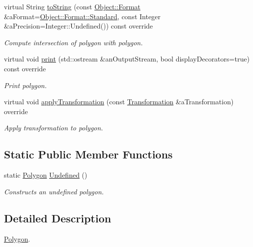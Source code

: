 \begin{DoxyCompactItemize}
virtual String \hyperlink{classlibrary_1_1math_1_1geom_1_1d2_1_1objects_1_1_polygon_acef17857f29323e985fba23441ed1171}{to\+String} (const \hyperlink{classlibrary_1_1math_1_1geom_1_1d2_1_1_object_ac8cd61dada4960cfee9a469231621b17}{Object\+::\+Format} \&a\+Format=\hyperlink{classlibrary_1_1math_1_1geom_1_1d2_1_1_object_ac8cd61dada4960cfee9a469231621b17aeb6d8ae6f20283755b339c0dc273988b}{Object\+::\+Format\+::\+Standard}, const Integer \&a\+Precision=Integer\+::\+Undefined()) const override
\begin{DoxyCompactList}\small\item\em Compute intersection of polygon with polygon. \end{DoxyCompactList}\item 
virtual void \hyperlink{classlibrary_1_1math_1_1geom_1_1d2_1_1objects_1_1_polygon_a028ca7818387654ed1aab1584cee6cc5}{print} (std\+::ostream \&an\+Output\+Stream, bool display\+Decorators=true) const override
\begin{DoxyCompactList}\small\item\em Print polygon. \end{DoxyCompactList}\item 
virtual void \hyperlink{classlibrary_1_1math_1_1geom_1_1d2_1_1objects_1_1_polygon_a920b30eb110c7164f65754979da17638}{apply\+Transformation} (const \hyperlink{classlibrary_1_1math_1_1geom_1_1d2_1_1_transformation}{Transformation} \&a\+Transformation) override
\begin{DoxyCompactList}\small\item\em Apply transformation to polygon. \end{DoxyCompactList}\end{DoxyCompactItemize}
\subsection*{Static Public Member Functions}
\begin{DoxyCompactItemize}
\item 
static \hyperlink{classlibrary_1_1math_1_1geom_1_1d2_1_1objects_1_1_polygon}{Polygon} \hyperlink{classlibrary_1_1math_1_1geom_1_1d2_1_1objects_1_1_polygon_a86e2c184f51c1e93fce5a786457b9fc3}{Undefined} ()
\begin{DoxyCompactList}\small\item\em Constructs an undefined polygon. \end{DoxyCompactList}\end{DoxyCompactItemize}


\subsection{Detailed Description}
\hyperlink{classlibrary_1_1math_1_1geom_1_1d2_1_1objects_1_1_polygon}{Polygon}. 


